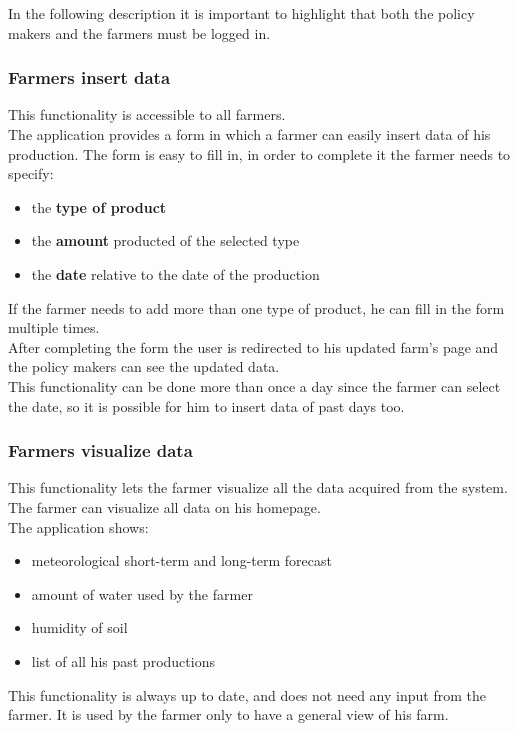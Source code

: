 In the following description it is important to highlight that both
the policy makers and the farmers must be logged in.

\subsubsection{Farmers insert data} 
This functionality is accessible to all farmers.\\
The application provides a form in which a farmer can easily insert data of his production.
The form is easy to fill in, in order to complete it the farmer needs to specify:
\begin{itemize}
    \item the \textbf{type of product}
    \item the \textbf{amount} producted of the selected type
    \item the \textbf{date} relative to the date of the production
\end{itemize}
If the farmer needs to add more than one type of product, 
he can fill in the form multiple times.\\
After completing the form the user is redirected to his updated farm's page and the policy makers 
can see the updated data.\\
This functionality can be done more than once a day since the farmer can select the date, 
so it is possible for him to insert data of past days too.



\subsubsection{Farmers visualize data}
This functionality lets the farmer visualize all the data 
acquired from the system. The farmer can visualize all data on his homepage.\\
The application shows:
\begin{itemize}
    \item meteorological  short-term and long-term forecast
    \item amount of water used by the farmer
    \item humidity of soil 
    \item list of all his past productions
\end{itemize}

\noindent This functionality is always up to date, and does not need 
any input from the farmer.
It is used by the farmer only to have a general view of 
his farm.



